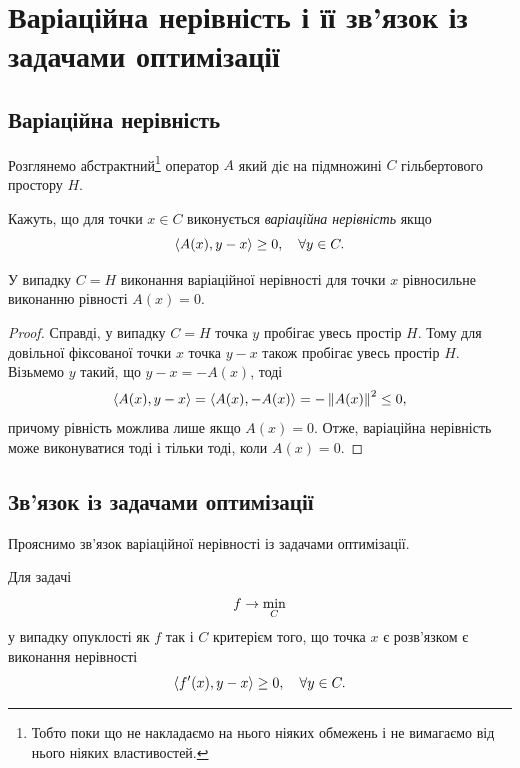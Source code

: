 \chapter{Варіаційна нерівність і її зв'язок із задачами оптимізації}

\section{Варіаційна нерівність}

Розглянемо абстрактний\footnote{Тобто поки що не накладаємо на нього ніяких обмежень і не вимагаємо від нього ніяких властивостей.} оператор $A$ який діє на підмножині $C$ гільбертового простору $H$. 

\begin{definition}
    Кажуть, що для точки $x \in C$ виконується \emph{варіаційна нерівність} якщо
    \begin{equation}
        \sp{A(x), y - x} \ge 0, \quad \forall y \in C.
    \end{equation}
\end{definition}

\begin{proposition}
    У випадку $C = H$ виконання варіаційної нерівності для точки $x$ рівносильне виконанню рівності $A(x) = 0$.
\end{proposition}

\begin{proof}
    Справді, у випадку $C = H$ точка $y$ пробігає увесь простір $H$. Тому для довільної фіксованої точки $x$ точка $y - x$ також пробігає увесь простір $H$. Візьмемо $y$ такий, що $y - x = -A(x)$, тоді 
    \begin{equation}
        \sp{A(x), y - x} = \sp{A(x), -A(x)} = - \no{A(x)}^2 \le 0,
    \end{equation}
    причому рівність можлива лише якщо $A(x) = 0$. Отже, варіаційна нерівність може виконуватися тоді і тільки тоді, коли $A(x) = 0$.
\end{proof}

\section{Зв'язок із задачами оптимізації}

Прояснимо зв'язок варіаційної нерівності із задачами оптимізації. \medskip

\begin{proposition}
    Для задачі
    \begin{equation}
        f \to \Min_C
    \end{equation}
    у випадку опуклості як $f$ так і $C$ критерієм того, що точка $x$ є розв'язком є виконання нерівності
    \begin{equation}
        \sp{f'(x), y - x} \ge 0, \quad \forall y \in C.
    \end{equation}
\end{proposition}


